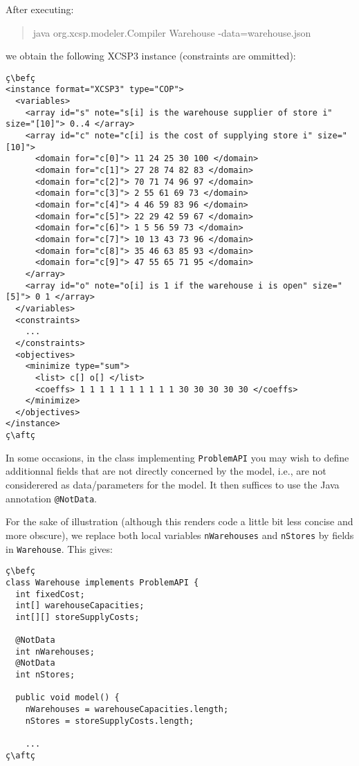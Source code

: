 \documentclass[10pt]{article}
\def\xt{{\rm XCSP3}\xspace}
\newcommand{\nn}[1]{{\tt #1}} %
\def\xt{{\rm XCSP3}\xspace}
\newenvironment{myvb}{\endgraf\small\verbatim}{\endverbatim}
\def\bef{\rule{10cm}{0.1mm}} %
\def\aft{\rule{10cm}{0.1mm}\medskip}
\begin{document}
After executing:
\begin{quote}
\begin{myvb}
java org.xcsp.modeler.Compiler Warehouse -data=warehouse.json
\end{myvb}
\end{quote}
we obtain the following \xt instance (constraints are ommitted):

\begin{lstlisting}
ç\befç
<instance format="XCSP3" type="COP">
  <variables>
    <array id="s" note="s[i] is the warehouse supplier of store i" size="[10]"> 0..4 </array>
    <array id="c" note="c[i] is the cost of supplying store i" size="[10]">
      <domain for="c[0]"> 11 24 25 30 100 </domain>
      <domain for="c[1]"> 27 28 74 82 83 </domain>
      <domain for="c[2]"> 70 71 74 96 97 </domain>
      <domain for="c[3]"> 2 55 61 69 73 </domain>
      <domain for="c[4]"> 4 46 59 83 96 </domain>
      <domain for="c[5]"> 22 29 42 59 67 </domain>
      <domain for="c[6]"> 1 5 56 59 73 </domain>
      <domain for="c[7]"> 10 13 43 73 96 </domain>
      <domain for="c[8]"> 35 46 63 85 93 </domain>
      <domain for="c[9]"> 47 55 65 71 95 </domain>
    </array>
    <array id="o" note="o[i] is 1 if the warehouse i is open" size="[5]"> 0 1 </array>
  </variables>
  <constraints>
    ...
  </constraints>
  <objectives>
    <minimize type="sum">
      <list> c[] o[] </list>
      <coeffs> 1 1 1 1 1 1 1 1 1 1 30 30 30 30 30 </coeffs>
    </minimize>
  </objectives>
</instance>
ç\aftç
\end{lstlisting}


In some occasions, in the class implementing \nn{ProblemAPI} you may wish to define additionnal fields that are not directly concerned by the model, i.e., are not considerered as data/parameters for the model. 
It then suffices to use the Java annotation \nn{@NotData}.

For the sake of illustration (although this renders code a little bit less concise and more obscure), we replace both local variables \texttt{nWarehouses} and \texttt{nStores} by fields in \nn{Warehouse}.
This gives:

\begin{lstlisting}
ç\befç
class Warehouse implements ProblemAPI {
  int fixedCost;
  int[] warehouseCapacities;
  int[][] storeSupplyCosts;

  @NotData
  int nWarehouses;
  @NotData
  int nStores;
  
  public void model() {
    nWarehouses = warehouseCapacities.length;
    nStores = storeSupplyCosts.length;
    
    ... 
ç\aftç
\end{lstlisting}
\end{document}
